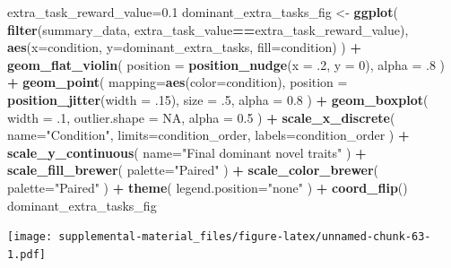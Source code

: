 \documentclass[]{book}
\newenvironment{Shaded}{\begin{snugshade}}{\end{snugshade}}
\newcommand{\DataTypeTok}[1]{\textcolor[rgb]{0.13,0.29,0.53}{#1}}
\newcommand{\DecValTok}[1]{\textcolor[rgb]{0.00,0.00,0.81}{#1}}
\newcommand{\FloatTok}[1]{\textcolor[rgb]{0.00,0.00,0.81}{#1}}
\newcommand{\KeywordTok}[1]{\textcolor[rgb]{0.13,0.29,0.53}{\textbf{#1}}}
\newcommand{\NormalTok}[1]{#1}
\newcommand{\OperatorTok}[1]{\textcolor[rgb]{0.81,0.36,0.00}{\textbf{#1}}}
\newcommand{\OtherTok}[1]{\textcolor[rgb]{0.56,0.35,0.01}{#1}}
\newcommand{\StringTok}[1]{\textcolor[rgb]{0.31,0.60,0.02}{#1}}
\begin{document}
\begin{Shaded}
\begin{Highlighting}[]
\NormalTok{extra_task_reward_value=}\FloatTok{0.1}
\NormalTok{dominant_extra_tasks_fig <-}\StringTok{ }\KeywordTok{ggplot}\NormalTok{(}
    \KeywordTok{filter}\NormalTok{(summary_data, extra_task_value}\OperatorTok{==}\NormalTok{extra_task_reward_value),}
    \KeywordTok{aes}\NormalTok{(}\DataTypeTok{x=}\NormalTok{condition, }\DataTypeTok{y=}\NormalTok{dominant_extra_tasks, }\DataTypeTok{fill=}\NormalTok{condition)}
\NormalTok{  ) }\OperatorTok{+}
\StringTok{  }\KeywordTok{geom_flat_violin}\NormalTok{(}
    \DataTypeTok{position =} \KeywordTok{position_nudge}\NormalTok{(}\DataTypeTok{x =} \FloatTok{.2}\NormalTok{, }\DataTypeTok{y =} \DecValTok{0}\NormalTok{),}
    \DataTypeTok{alpha =} \FloatTok{.8}
\NormalTok{  ) }\OperatorTok{+}
\StringTok{  }\KeywordTok{geom_point}\NormalTok{(}
    \DataTypeTok{mapping=}\KeywordTok{aes}\NormalTok{(}\DataTypeTok{color=}\NormalTok{condition),}
    \DataTypeTok{position =} \KeywordTok{position_jitter}\NormalTok{(}\DataTypeTok{width =} \FloatTok{.15}\NormalTok{),}
    \DataTypeTok{size =} \FloatTok{.5}\NormalTok{,}
    \DataTypeTok{alpha =} \FloatTok{0.8}
\NormalTok{  ) }\OperatorTok{+}
\StringTok{  }\KeywordTok{geom_boxplot}\NormalTok{(}
    \DataTypeTok{width =} \FloatTok{.1}\NormalTok{,}
    \DataTypeTok{outlier.shape =} \OtherTok{NA}\NormalTok{,}
    \DataTypeTok{alpha =} \FloatTok{0.5}
\NormalTok{  ) }\OperatorTok{+}
\StringTok{  }\KeywordTok{scale_x_discrete}\NormalTok{(}
    \DataTypeTok{name=}\StringTok{"Condition"}\NormalTok{,}
    \DataTypeTok{limits=}\NormalTok{condition_order,}
    \DataTypeTok{labels=}\NormalTok{condition_order}
\NormalTok{  ) }\OperatorTok{+}
\StringTok{  }\KeywordTok{scale_y_continuous}\NormalTok{(}
    \DataTypeTok{name=}\StringTok{"Final dominant novel traits"}
\NormalTok{  ) }\OperatorTok{+}
\StringTok{  }\KeywordTok{scale_fill_brewer}\NormalTok{(}
    \DataTypeTok{palette=}\StringTok{"Paired"}
\NormalTok{  ) }\OperatorTok{+}
\StringTok{  }\KeywordTok{scale_color_brewer}\NormalTok{(}
    \DataTypeTok{palette=}\StringTok{"Paired"}
\NormalTok{  ) }\OperatorTok{+}
\StringTok{  }\KeywordTok{theme}\NormalTok{(}
    \DataTypeTok{legend.position=}\StringTok{"none"}
\NormalTok{  ) }\OperatorTok{+}
\StringTok{  }\KeywordTok{coord_flip}\NormalTok{()}
\NormalTok{dominant_extra_tasks_fig}
\end{Highlighting}
\end{Shaded}

\texttt{[image: supplemental-material\_files/figure-latex/unnamed-chunk-63-1.pdf]}
\end{document}
